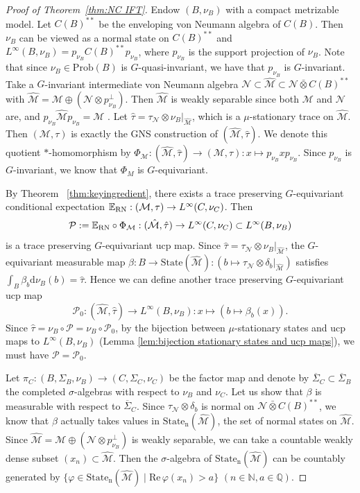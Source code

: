 \documentclass[12pt]{amsart}
\newcommand{\Q}{{\mathbb Q}}
\newcommand{\N}{{\mathbb N}}
\newcommand{\cM}{{\mathcal M}}
\newcommand{\cP}{{\mathcal P}}
\newcommand{\cN}{{\mathcal N}}
\newcommand{\RN}{{\rm RN}}
\def\d{\mathrm{d}}
\def\Prob{\mathrm{Prob}}
\theoremstyle{definition}
\begin{document}
\begin{proof}[Proof of Theorem~\ref{thm:NC IFT}]
Endow $(B,\nu_B)$ with a compact metrizable model. Let $C(B)^{**}$ be the enveloping von Neumann algebra of $C(B)$. Then $\nu_B$ can be viewed as a normal state on $C(B)^{**}$ and $L^\infty(B,\nu_B)=p_{\nu_B}C(B)^{**}p_{\nu_B}$, where $p_{\nu_B}$ is the support projection of $\nu_B$. Note that since $\nu_B\in\Prob(B)$ is $G$-quasi-invariant, we have that $p_{\nu_B}$ is $G$-invariant. Take a $G$-invariant intermediate von Neumann algebra $\cN\subset\hat{\cM}\subset \cN\bar{\otimes} C(B)^{**}$ with $\hat{\cM}=\cM\oplus (\cN\otimes p_{\nu_B}^\perp)$. Then $\hat{\cM}$ is weakly separable since both $\cM$ and $\cN$ are, and $p_{\nu_B}\hat{\cM}p_{\nu_B}=\cM$ . Let $\hat{\tau}=\tau_\cN\otimes\nu_B|_{\hat{\cM}}$, which is a $\mu$-stationary trace on $\hat{\cM}$. Then $(\cM,\tau)$ is exactly the GNS construction of $(\hat{\cM},\hat{\tau})$. We denote this quotient $\ast$-homomorphism by $\Phi_\cM:(\hat{\cM},\hat{\tau})\to(\cM,\tau):x\mapsto p_{\nu_B}xp_{\nu_B}$. Since $p_{\nu_B}$ is $G$-invariant, we know that $\Phi_M$ is $G$-equivariant.

By Theorem~ \ref{thm:keyingredient}, there exists a trace preserving $G$-equivariant conditional expectation $\mathbb{E}_\RN:(\cM,\tau)\to L^\infty(C,\nu_C)$. Then $$\cP:=\mathbb{E}_\RN\circ\Phi_\cM:(\hat{\cM},\hat{\tau})\to L^\infty(C,\nu_C)\subset L^\infty(B,\nu_B)$$ is a trace preserving $G$-equivariant ucp map. Since $\hat{\tau}=\tau_\cN\otimes\nu_B|_{\hat{\cM}}$, the $G$-equivariant measurable map $\beta:B\to\mathrm{State}(\hat{\cM}):(b\mapsto\tau_\cN\otimes\delta_b|_{\hat{\cM}})$ satisfies $\int_B\beta_b\d \nu_B(b)=\hat{\tau}$. Hence we can define another trace preserving $G$-equivariant ucp map
$$\cP_0 : (\hat{\cM},\hat{\tau})\to L^\infty(B,\nu_B):x\mapsto (b\mapsto\beta_b(x)).$$
Since $\hat{\tau}=\nu_B\circ \cP=\nu_B\circ\cP_0$, by the bijection between $\mu$-stationary states and ucp maps to $L^\infty(B,\nu_B)$ (Lemma \ref{lem:bijection stationary states and ucp maps}), we must have $\cP=\cP_0$. 

Let $\pi_C:(B,\Sigma_B,\nu_B)\to(C,\Sigma_C,\nu_C)$ be the factor map and denote by $\overline{\Sigma}_C\subset\overline{\Sigma}_B$ the completed $\sigma$-algebras with respect to $\nu_B$ and $\nu_C$. Let us show that $\beta$ is measurable with respect to $\overline{\Sigma}_C$. Since $\tau_\cN\otimes\delta_b$ is normal on $\cN\bar{\otimes} C(B)^{**}$, we know that $\beta$ actually takes values in $\mathrm{State_n}(\hat{\cM})$, the set of normal states on $\hat{\cM}$. Since $\hat{\cM}=\cM\oplus (\cN\otimes p_{\nu_B}^\perp)$ is weakly separable, we can take a countable weakly dense subset $(x_n)\subset \hat{\cM}$. Then the $\sigma$-algebra of $\mathrm{State_n}(\hat{\cM})$ can be countably generated by $\{\varphi\in\mathrm{State_n}(\hat{\cM})\mid \mathrm{Re}\,\varphi(x_n)>a\}$ $(n\in \N, a\in\Q)$.


\end{proof}
\end{document}

